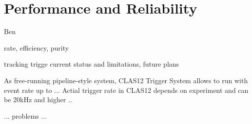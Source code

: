 \section{Performance and Reliability} Ben

rate, efficiency, purity

tracking trigge current status and limitations, future plans



As free-running pipeline-style system, CLAS12 Trigger System allows to run with event rate up to ...
Actial trigger rate in CLAS12 depends on experiment and can be 20kHz and higher ..

... problems ...